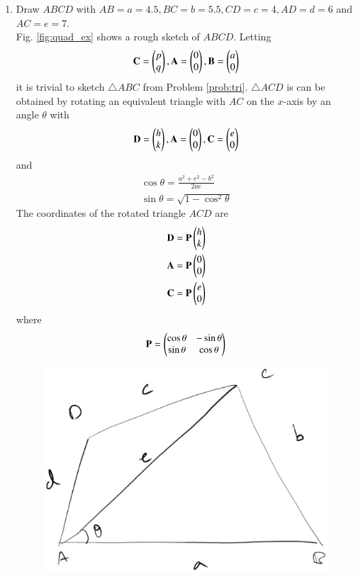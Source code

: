 \renewcommand{\theequation}{\theenumi}
\begin{enumerate}[label=\arabic*.,ref=\thesubsection.\theenumi]

\item Draw $ABCD$ with $AB=a=4.5, BC  =b=5.5, CD =c= 4, AD =d=6$ and $AC=e = 7$.
\\
\solution Fig. \ref{fig:quad_ex} shows a rough sketch of $ABCD$. Letting
\begin{align}
\label{eq:tri_basic_new}
\mathbf{C} = \begin{pmatrix}p\\q\end{pmatrix}, \mathbf{A} = \begin{pmatrix}0\\0\end{pmatrix}, \mathbf{B} = \begin{pmatrix}a\\0\end{pmatrix}
\end{align}
%
it is trivial to sketch $\triangle ABC$ from  Problem \ref{prob:tri}.
%
$\triangle ACD$ is can be obtained by rotating an equivalent triangle with $AC$ on
the $x$-axis by an angle $\theta$ with
\begin{align}
\label{eq:tri_basic_rot}
\mathbf{D} = \begin{pmatrix}h\\k\end{pmatrix}, \mathbf{A} = \begin{pmatrix}0\\0\end{pmatrix}, \mathbf{C} = \begin{pmatrix}e\\0\end{pmatrix}
\end{align}
%
and
\begin{align}
\label{eq:tri_rot_ang}
\cos \theta = \frac{a^2+e^2-b^2}{2ae}
\\
\sin \theta = \sqrt{1-\cos^2\theta}
\end{align}
%
The coordinates of the rotated triangle $ACD$ are
\begin{align}
\label{eq:tri_rot_trans}
\mathbf{D} = \mathbf{P}\begin{pmatrix}h\\k\end{pmatrix}
\\
\mathbf{A} = \mathbf{P}\begin{pmatrix}0\\0\end{pmatrix}
\\
\mathbf{C} = \mathbf{P}\begin{pmatrix}e\\0\end{pmatrix}
\end{align}
%
where 
\begin{align}
\label{eq:tri_rot_mat}
\mathbf{P} = \begin{pmatrix}\cos\theta & -\sin \theta\\ \sin \theta & \cos \theta\end{pmatrix}
\end{align}
\begin{figure}[!ht]
\includegraphics[width=\columnwidth]{./quad/figs/quad_ex.eps}

\end{figure}
\end{enumerate}
